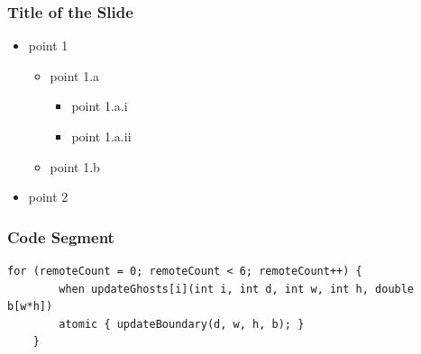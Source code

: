\documentclass{beamer}
\begin{document}
\begin{frame}[fragile]

  \frametitle{Title of the Slide}

  \begin{itemize}
    \item point 1
      \begin{itemize}
      \item point 1.a
        \begin{itemize}
        \item point 1.a.i
        \item point 1.a.ii
        \end{itemize}
      \item point 1.b
      \end{itemize}
    \item point 2
  \end{itemize}
\end{frame}

\begin{frame}[fragile]
  \frametitle{Code Segment}

  \begin{lstlisting}[basicstyle=\footnotesize]
    for (remoteCount = 0; remoteCount < 6; remoteCount++) {
        when updateGhosts[i](int i, int d, int w, int h, double b[w*h])
        atomic { updateBoundary(d, w, h, b); }
    }
  \end{lstlisting}

\end{frame}
\end{document}
